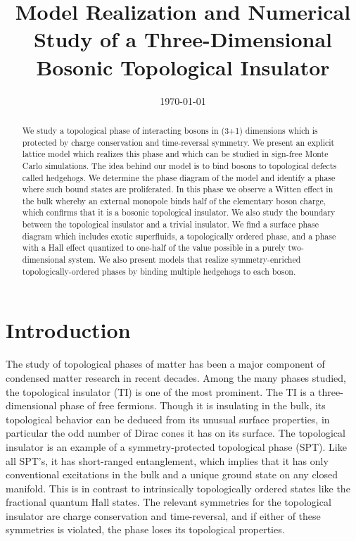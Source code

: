 \documentclass[prb,twocolumn]{revtex4-1}
\begin{document}
\title{Model Realization and Numerical Study of a Three-Dimensional Bosonic Topological Insulator}
\date{\today}
\pacs{}


\begin{abstract}
We study a topological phase of interacting bosons in (3+1) dimensions which is protected by charge conservation and time-reversal symmetry. We present an explicit lattice model which realizes this phase and which can be studied in sign-free Monte Carlo simulations. The idea behind our model is to bind bosons to topological defects called hedgehogs. We determine the phase diagram of the model and identify a phase where such bound states are proliferated.  In this phase we observe a Witten effect in the bulk whereby an external monopole binds half of the elementary boson charge, which confirms that it is a bosonic topological insulator. We also study the boundary between the topological insulator and a trivial insulator. We find a surface phase diagram which includes exotic superfluids, a topologically ordered phase, and a phase with a Hall effect quantized to one-half of the value possible in a purely two-dimensional system. We also present models that realize symmetry-enriched topologically-ordered phases by binding multiple hedgehogs to each boson. 
\end{abstract}
\maketitle

\section{Introduction}
The study of topological phases of matter has been a major component of condensed matter research in recent decades. Among the many phases studied, the topological insulator (TI) is one of the most prominent.\cite{KaneHasanRMP,QiZhangRMP} The TI is a three-dimensional phase of free fermions. Though it is insulating in the bulk, its topological behavior can be deduced from its unusual surface properties, in particular the odd number of Dirac cones it has on its surface. The topological insulator is an example of a symmetry-protected topological phase (SPT).  Like all SPT's, it has short-ranged entanglement, which implies that it has only conventional excitations in the bulk and a unique ground state on any closed manifold. This is in contrast to intrinsically topologically ordered states like the fractional quantum Hall states. The relevant symmetries for the topological insulator are charge conservation and time-reversal, and if either of these symmetries is violated, the phase loses its topological properties.
\end{document}
